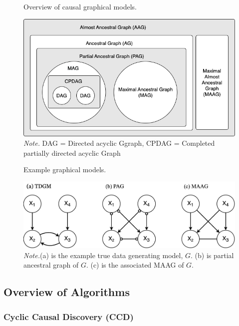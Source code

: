 \documentclass[11pt]{article}
\theoremstyle{definition}
\begin{document}
\begin{figure}[H]
    \centering
        \caption{Overview of causal graphical models.}
        \includegraphics[scale=.6]{figures/diagram.png}
        \vspace{3mm}
        \caption*{\textit{Note.} DAG = Directed acyclic Ggraph, CPDAG = Completed partially directed acyclic Graph}
    \label{fig:1}
\end{figure}

\begin{figure}[H]
    \centering
        \caption{Example graphical models.}
        \includegraphics[scale=.4]{figures/graphs.png}
        \vspace{3mm}
        \caption*{\textit{Note.}(a) is the example true data generating model, $G$. (b) is partial ancestral graph of $G$. (c) is the associated MAAG of $G$.}
    \label{fig:2}
\end{figure}



\subsection{Overview of Algorithms}
\subsubsection{Cyclic Causal Discovery (CCD)}
\end{document}
